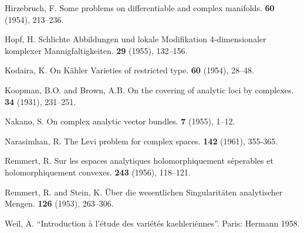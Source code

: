 \documentclass{article}
\theoremstyle{plain}
\begin{document}
\begin{thebibliography}{20}
  {\sc Hirzebruch, F.}
  \newblock Some problems on differentiable and complex manifolds.
   {\bf 60} (1954), 213--236.

  {\sc Hopf, H.}
  \newblock Schlichte Abbildungen und lokale Modifikation 4-dimensionaler komplexer Mannigfaltigkeiten.
   {\bf 29} (1955), 132--156.

  {\sc Kodaira, K.}
  \newblock On K\"{a}hler Varieties of restricted type.
   {\bf 60} (1954), 28--48.

  {\sc Koopman, B.O. and Brown, A.B.}
  \newblock On the covering of analytic loci by complexes.
   {\bf 34} (1931), 231--251.

  {\sc Nakano, S.}
  \newblock On complex analytic vector bundles.
   {\bf 7} (1955), 1--12.

  {\sc Narasimhan, R.}
  \newblock The Levi problem for complex spaces.
   {\bf 142} (1961), 355-365.

  {\sc Remmert, R.}
  \newblock Sur les espaces analytiques holomorphiquement s\'{e}perables et holomorphiquement convexes.
   {\bf 243} (1956), 118--121.

  {\sc Remmert, R. and Stein, K.}
  \newblock \"{U}ber die wesentlichen Singularit\"{a}ten analytischer Mengen.
   {\bf 126} (1953), 263--306.

  {\sc Weil, A.}
  \newblock ``Introduction \`{a} l'\'{e}tude des vari\'{e}t\'{e}s kaehleri\'{e}nnes''.
  \newblock Paris: Hermann 1958.

\end{thebibliography}
\end{document}
